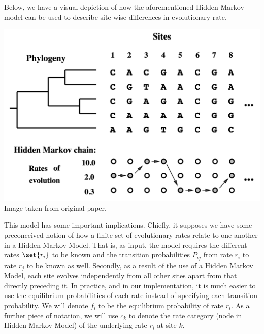 \documentclass[12pt]{article}
\begin{document}
    Below, we have a visual depiction of how the aforementioned Hidden Markov model can be used to describe site-wise differences in evolutionary rate,
    \begin{center}
        \includegraphics[scale=0.25]{../figs/hmm_model.png} \\
        \small{Image taken from original paper.}
    \end{center}
    This model has some important implications.
    Chiefly, it supposes we have some preconceived notion of how a finite set of evolutionary rates relate to one another in a Hidden Markov Model.
    That is, as input, the model requires the different rates $\set{r_i}$ to be known and the transition probabilities $P_{ij}$ from rate $r_i$ to rate $r_j$ to be known as well.
    Secondly, as a result of the use of a Hidden Markov Model, each site evolves independently from all other sites apart from that directly preceding it.
    In practice, and in our implementation, it is much easier to use the equilibrium probabilities of each rate instead of specifying each transition probability.
    We will denote $f_i$ to be the equilibrium probability of rate $r_i$.
    As a further piece of notation, we will use $c_k$ to denote the rate category (node in Hidden Markov Model) of the underlying rate $r_i$ at site $k$.
\end{document}
